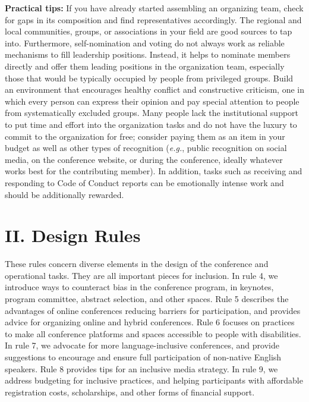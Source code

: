 \documentclass[10pt,letterpaper]{article}
\begin{document}
 \textbf{Practical tips:} If you have already started assembling an organizing team, check for gaps in its composition and find representatives accordingly. 
The regional and local communities, groups, or associations in your field are good sources to tap into. 
Furthermore, self-nomination and voting do not always work as reliable mechanisms to fill leadership positions. Instead, it helps to nominate members directly and offer them leading positions in the organization team, especially those that would be typically occupied by people from privileged groups.
Build an environment that encourages healthy conflict and constructive criticism, one in which every person can express their opinion and pay special attention to people from systematically excluded groups.
Many people lack the institutional support to put time and effort into the organization tasks and do not have the luxury to commit to the organization for free; consider paying them as an item in your budget as well as other types of recognition (\textit{e.g.}, public recognition on social media, on the conference website, or during the conference, ideally whatever works best for the contributing member).
In addition, tasks such as receiving and responding to Code of Conduct reports can be emotionally intense work and should be additionally rewarded.



\section*{II. Design Rules}

These rules concern diverse elements in the design of the conference and operational tasks. They are all important pieces for inclusion.
In rule 4, we introduce ways to counteract bias in the conference program, in keynotes, program committee, abstract selection, and other spaces. 
Rule 5 describes the advantages of online conferences reducing barriers for participation, and provides advice for organizing online and hybrid conferences.
Rule 6 focuses on practices to make all conference platforms and spaces accessible to people with disabilities. 
In rule 7, we advocate for more language-inclusive conferences, and provide suggestions to encourage and ensure full participation of non-native English speakers. 
Rule 8 provides tips for an inclusive media strategy. 
In rule 9, we address budgeting for inclusive practices, and helping participants with affordable registration costs, scholarships, and other forms of financial support.
\end{document}
